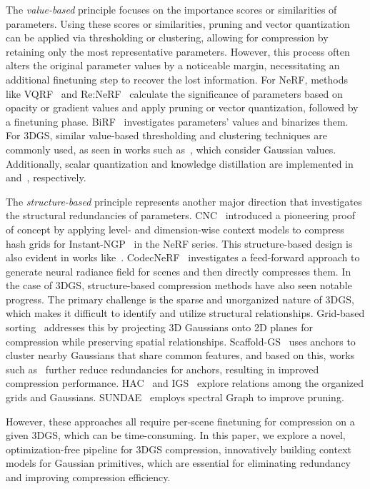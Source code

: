 \documentclass{article} %
\begin{document}
The \textit{value-based} principle focuses on the importance scores or similarities of parameters. Using these scores or similarities, pruning and vector quantization can be applied via thresholding or clustering, allowing for compression by retaining only the most representative parameters. However, this process often alters the original parameter values by a noticeable margin, necessitating an additional finetuning step to recover the lost information.
For NeRF, methods like VQRF~\citep{VQRF} and Re:NeRF~\citep{Re:NeRF} calculate the significance of parameters based on opacity or gradient values and apply pruning or vector quantization, followed by a finetuning phase. BiRF~\cite{BiRF} investigates parameters' values and binarizes them.
For 3DGS, similar value-based thresholding and clustering techniques are commonly used, as seen in works such as~\citet{Lee, Simon, Navaneet, Lightgaussian, EAGLES, RDOGaussian, Trimming, mini}, which consider Gaussian values. Additionally, scalar quantization and knowledge distillation are implemented in~\cite{EAGLES} and~\citep{Lightgaussian}, respectively.

The \textit{structure-based} principle represents another major direction that investigates the structural redundancies of parameters. CNC~\citep{CNC} introduced a pioneering proof of concept by applying level- and dimension-wise context models to compress hash grids for Instant-NGP~\citep{INGP} in the NeRF series. This structure-based design is also evident in works like~\citet{Compressible, wavelet, SHACIRA, NeRFCodec}.  CodecNeRF~\citep{codecnerf} investigates a feed-forward approach to generate neural radiance field for scenes and then directly compresses them.
In the case of 3DGS, structure-based compression methods have also seen notable progress. The primary challenge is the sparse and unorganized nature of 3DGS, which makes it difficult to identify and utilize structural relationships. Grid-based sorting~\citep{SOG} addresses this by projecting 3D Gaussians onto 2D planes for compression while preserving spatial relationships. Scaffold-GS~\citep{scaffold} uses anchors to cluster nearby Gaussians that share common features, and based on this, works such as~\citet{HAC, compgs, Contextgs} further reduce redundancies for anchors, resulting in improved compression performance. HAC~\citep{HAC} and IGS~\citep{IGS} explore relations among the organized grids and Gaussians. SUNDAE~\citep{SUNDAE} employs spectral Graph to improve pruning.

However, these approaches all require per-scene finetuning for compression on a given 3DGS, which can be time-consuming. 
In this paper, we explore a novel, optimization-free pipeline for 3DGS compression, innovatively building context models for Gaussian primitives, which are essential for eliminating redundancy and improving compression efficiency.
\end{document}
